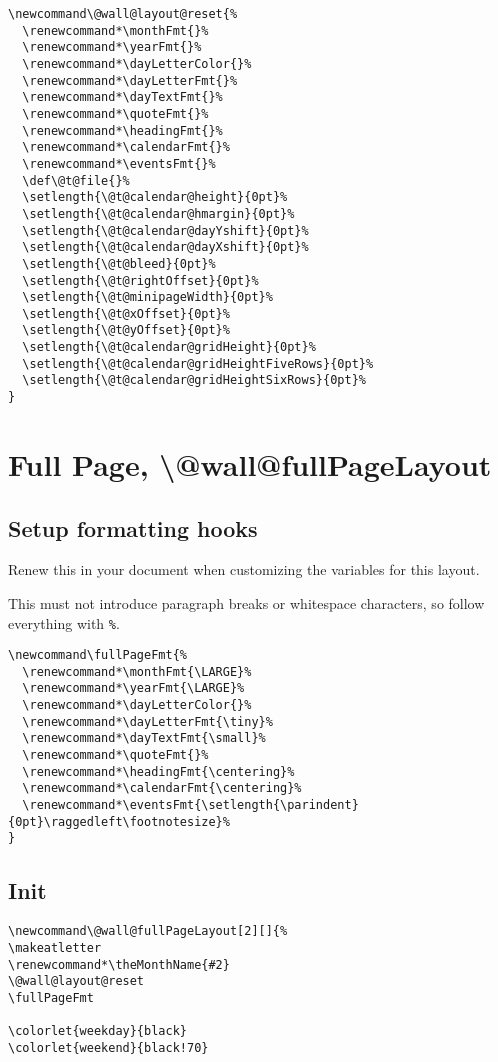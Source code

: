\documentclass[11pt,oneside]{memoir-article}
\begin{document}
\begin{verbatim}
\newcommand\@wall@layout@reset{%
  \renewcommand*\monthFmt{}%
  \renewcommand*\yearFmt{}%
  \renewcommand*\dayLetterColor{}%
  \renewcommand*\dayLetterFmt{}%
  \renewcommand*\dayTextFmt{}%
  \renewcommand*\quoteFmt{}%
  \renewcommand*\headingFmt{}%
  \renewcommand*\calendarFmt{}%
  \renewcommand*\eventsFmt{}%
  \def\@t@file{}%
  \setlength{\@t@calendar@height}{0pt}%
  \setlength{\@t@calendar@hmargin}{0pt}%
  \setlength{\@t@calendar@dayYshift}{0pt}%
  \setlength{\@t@calendar@dayXshift}{0pt}%
  \setlength{\@t@bleed}{0pt}%
  \setlength{\@t@rightOffset}{0pt}%
  \setlength{\@t@minipageWidth}{0pt}%
  \setlength{\@t@xOffset}{0pt}%
  \setlength{\@t@yOffset}{0pt}%
  \setlength{\@t@calendar@gridHeight}{0pt}%
  \setlength{\@t@calendar@gridHeightFiveRows}{0pt}%
  \setlength{\@t@calendar@gridHeightSixRows}{0pt}%
}
\end{verbatim}

\section{Full Page, \textbackslash @wall@fullPageLayout}
\label{sec:org7f4668b}
\subsection{Setup formatting hooks}
\label{sec:orgad7ee7e}

Renew this in your document when customizing the variables for this layout.

This must not introduce paragraph breaks or whitespace characters, so follow
everything with \texttt{\%}.

\begin{verbatim}
\newcommand\fullPageFmt{%
  \renewcommand*\monthFmt{\LARGE}%
  \renewcommand*\yearFmt{\LARGE}%
  \renewcommand*\dayLetterColor{}%
  \renewcommand*\dayLetterFmt{\tiny}%
  \renewcommand*\dayTextFmt{\small}%
  \renewcommand*\quoteFmt{}%
  \renewcommand*\headingFmt{\centering}%
  \renewcommand*\calendarFmt{\centering}%
  \renewcommand*\eventsFmt{\setlength{\parindent}{0pt}\raggedleft\footnotesize}%
}
\end{verbatim}

\subsection{Init}
\label{sec:orgc1d7389}

\begin{verbatim}
\newcommand\@wall@fullPageLayout[2][]{%
\makeatletter
\renewcommand*\theMonthName{#2}
\@wall@layout@reset
\fullPageFmt

\colorlet{weekday}{black}
\colorlet{weekend}{black!70}
\end{verbatim}
\end{document}
